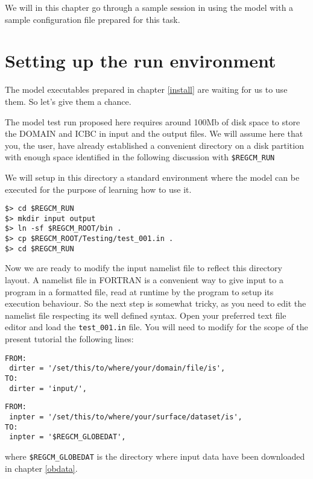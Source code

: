 %
%

We will in this chapter go through a sample session in using the model with
a sample configuration file prepared for this task.

\section{Setting up the run environment}

The model executables prepared in chapter \ref{install} are waiting for us to
use them. So let's give them a chance.

The model test run proposed here requires around 100Mb of disk space to store
the DOMAIN and ICBC in input and the output files. We will assume here that you,
the user, have already established a convenient directory on a disk partition
with enough space identified in the following discussion with \verb=$REGCM_RUN=

We will setup in this directory a standard environment where the model can be
executed for the purpose of learning how to use it.

\begin{Verbatim}
$> cd $REGCM_RUN
$> mkdir input output
$> ln -sf $REGCM_ROOT/bin .
$> cp $REGCM_ROOT/Testing/test_001.in .
$> cd $REGCM_RUN
\end{Verbatim}

Now we are ready to modify the input namelist file to reflect this directory
layout. A namelist file in FORTRAN is a convenient way to give input to a
program in a formatted file, read at runtime by the program to setup its
execution behaviour. So the next step is somewhat tricky, as you need to edit
the namelist file respecting its well defined syntax. Open your preferred text
file editor and load the \verb=test_001.in= file. You will need to modify for
the scope of the present tutorial the following lines:

\begin{Verbatim}
FROM:
 dirter = '/set/this/to/where/your/domain/file/is',
TO:
 dirter = 'input/',
\end{Verbatim}

\begin{Verbatim}
FROM:
 inpter = '/set/this/to/where/your/surface/dataset/is',
TO:
 inpter = '$REGCM_GLOBEDAT',
\end{Verbatim}

where \verb=$REGCM_GLOBEDAT= is the directory where input data have been
downloaded in chapter \ref{obdata}.


